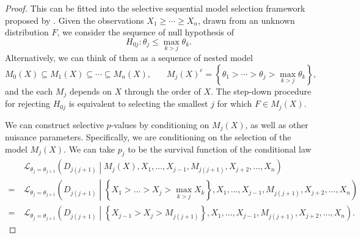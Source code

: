 \documentclass[11pt]{article}
\begin{document}
\begin{proof}

This can be fitted into the selective sequential model selection framework proposed by \citet{Fithian:2015uj}. Given the observations $X_1 \ge \cdots \ge X_n$, drawn from an unknown distribution $F$, we consider the sequence of null hypothesis of
$$H_{0j}: \theta_j \le \max_{k > j} \theta_k.$$
Alternatively, we can think of them as a sequence of nested model
$$M_0\left(X\right) \subseteq M_1\left(X\right) \subseteq \cdots \subseteq M_n\left(X\right), ~~~~~~~~ M_j\left(X\right)^c = \left\{\theta_1 > \cdots > \theta_j > \max_{k > j} \theta_k\right\},$$
and the each $M_j$ depends on $X$ through the order of $X$. The step-down procedure for rejecting $H_{0j}$ is equivalent to selecting the smallest $j$ for which $F \in M_j\left(X\right)$.

We can construct selective $p$-values by conditioning on $M_j\left(X\right)$, as well as other nuisance parameters. Specifically, we are conditioning on the selection of the model $M_j\left(X\right)$. We can take $p_j$ to be the survival function of the conditional law
\begin{align}
&~ \mathcal{L}_{\theta_j = \theta_{j+1}} \left(D_{j\left(j+1\right)} \middle| M_j\left(X\right), X_1, \ldots, X_{j-1}, M_{j\left(j+1\right)}, X_{j+2}, \ldots, X_n\right) \nonumber \\
= &~ \mathcal{L}_{\theta_j = \theta_{j+1}} \left(D_{j\left(j+1\right)} \middle| \left\{X_1 > \ldots > X_j > \max_{k > j} X_k\right\}, X_1, \ldots, X_{j-1}, M_{j\left(j+1\right)}, X_{j+2}, \ldots, X_n\right) \nonumber \\
= &~ \mathcal{L}_{\theta_j = \theta_{j+1}} \left(D_{j\left(j+1\right)} \middle| \left\{X_{j-1} > X_j > M_{j\left(j+1\right)}\right\}, X_1, \ldots, X_{j-1}, M_{j\left(j+1\right)}, X_{j+2}, \ldots, X_n\right). \label{eqn:step_down_law}
\end{align}


\end{proof}
\end{document}
